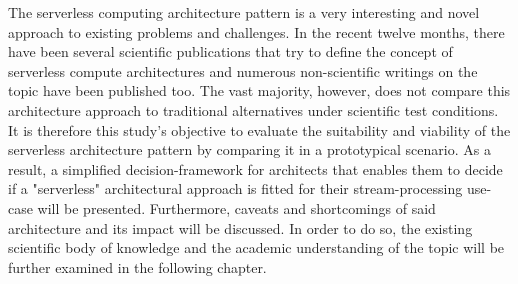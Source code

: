 The serverless computing architecture pattern is a very interesting and novel approach to existing problems and challenges. In the recent twelve months, there have been several scientific publications that try to define the concept of serverless compute architectures and numerous non-scientific writings on the topic have been published too. The vast majority, however, does not compare this architecture approach to traditional alternatives under scientific test conditions. \\
It is therefore this study's objective to evaluate the suitability and viability of the serverless architecture pattern by comparing it in a prototypical scenario. As a result, a simplified decision-framework for architects that enables them to decide if a "serverless" architectural approach is fitted for their stream-processing use-case will be presented. Furthermore, caveats and shortcomings of said architecture and its impact will be discussed. 
In order to do so, the existing scientific body of knowledge and the academic understanding of the topic will be further examined in the following chapter. 